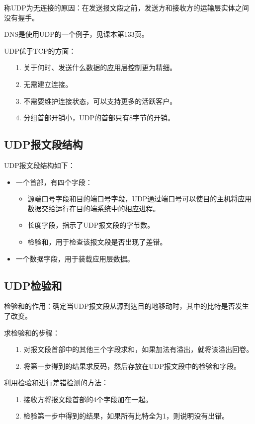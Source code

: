 \documentclass[a4paper,left=2.5cm,right=2.5cm,11pt]{article}
\begin{document}
	称UDP为无连接的原因：在发送报文段之前，发送方和接收方的运输层实体之间没有握手。\par

	DNS是使用UDP的一个例子，见课本第133页。\par

	UDP优于TCP的方面：
	\begin{itemize}
		\item[1.] 关于何时、发送什么数据的应用层控制更为精细。
		\item[2.] 无需建立连接。
		\item[3.] 不需要维护连接状态，可以支持更多的活跃客户。
		\item[4.] 分组首部开销小，UDP的首部只有8字节的开销。
	\end{itemize}

\subsection{UDP报文段结构}
	UDP报文段结构如下：
	\begin{itemize}
		\item 一个首部，有四个字段：
			\begin{itemize}
				\item 源端口号字段和目的端口号字段，UDP通过端口号可以使目的主机将应用数据交给运行在目的端系统中的相应进程。
				\item 长度字段，指示了UDP报文段的字节数。
				\item 检验和，用于检查该报文段是否出现了差错。
			\end{itemize}

		\item 一个数据字段，用于装载应用层数据。
	\end{itemize}

\subsection{UDP检验和}
	检验和的作用：确定当UDP报文段从源到达目的地移动时，其中的比特是否发生了改变。\par

	求检验和的步骤：
	\begin{itemize}
		\item[1.] 对报文段首部中的其他三个字段求和，如果加法有溢出，就将该溢出回卷。
		\item[2.] 将第一步得到的结果求反码，然后存放在UDP报文段中的检验和字段。
	\end{itemize}

	利用检验和进行差错检测的方法：
	\begin{itemize}
		\item[1.] 接收方将报文段首部的4个字段加在一起。
		\item[2.] 检验第一步中得到的结果，如果所有比特全为1，则说明没有出错。
	\end{itemize}
\end{document}
